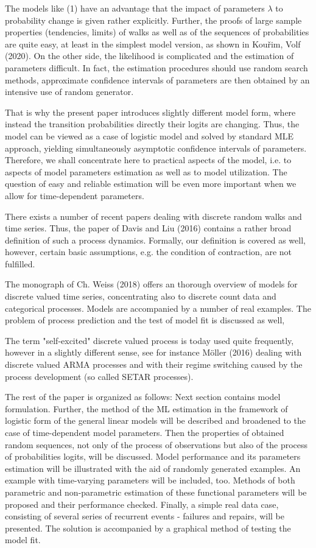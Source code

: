 \documentclass[11pt]{article}
\begin{document}
The models like (1) have an advantage that the impact of
parameters $\lambda$ to probability change is given rather
explicitly. Further, the proofs of large sample properties
(tendencies, limits) of walks as well as of the sequences of
probabilities are quite easy, at least in the simplest model
version, as shown in Kou\v{r}im, Volf (2020). On the other side,
the likelihood is complicated and the estimation of parameters
difficult. In fact, the estimation procedures should use random
search methods, approximate confidence intervals of parameters are
then obtained by an intensive use of random generator.

That is why the present paper introduces slightly different model
form, where instead the transition probabilities directly their
logits are changing. Thus, the model can be viewed as a case of
logistic model and solved by standard MLE approach, yielding
simultaneously asymptotic confidence intervals of parameters.
Therefore, we shall concentrate here to practical aspects of the
model, i.e. to aspects of model parameters estimation as well as
to model utilization. The question of easy and reliable estimation
will be even more important when we allow for time-dependent
parameters.

There exists a number of recent papers dealing
with discrete random walks and time series. Thus, the paper of
Davis and Liu (2016)  contains a rather
broad definition of such a process dynamics. Formally, our
definition is covered as well, however, certain basic assumptions, e.g.
the condition of contraction, are not fulfilled.

The monograph of Ch. Weiss (2018) offers an thorough overview of models  for discrete
valued time series, concentrating also to discrete count data and categorical processes.
Models are accompanied by a number of real examples. The problem of process prediction and
the test of model fit is discussed as well,

The term "self-excited" discrete valued process is today used quite frequently,
however in a slightly different sense, see for instance Möller (2016) dealing with
discrete valued ARMA processes  and with their regime switching caused by the
process development (so called SETAR processes).

  \medskip
The rest of the paper is organized as follows: Next section
contains model formulation. Further, the method of the ML
estimation in the framework of logistic form of the general linear
models will be described and broadened to the case of
time-dependent model parameters. Then the properties of obtained
random sequences, not only of the process of observations but also
of the process of probabilities logits, will be discussed. Model
performance and its parameters estimation will be illustrated with
the aid of randomly generated examples. An example with
time-varying parameters will be included, too. Methods of both parametric and non-parametric
estimation of these functional parameters will be proposed and their performance checked.
Finally, a simple real data case, consisting of several series of recurrent events - failures and repairs,
will be presented. The solution is accompanied by a graphical method of testing the model fit.
\end{document}
